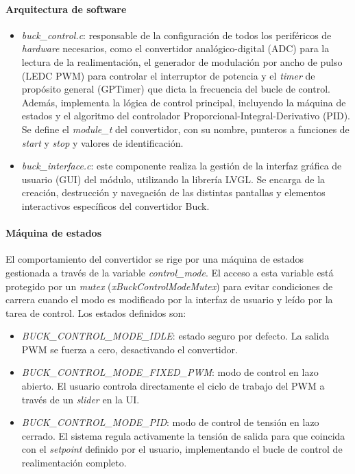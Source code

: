 \paragraph{Arquitectura de software}

\begin{itemize}[noitemsep]
    \item \textit{buck\_control.c}: responsable de la configuración de todos los periféricos de \textit{hardware} necesarios, como el convertidor analógico-digital (ADC) para la lectura de la realimentación, el generador de modulación por ancho de pulso (LEDC PWM) para controlar el interruptor de potencia y el \textit{timer} de propósito general (GPTimer) que dicta la frecuencia del bucle de control. Además, implementa la lógica de control principal, incluyendo la máquina de estados y el algoritmo del controlador Proporcional-Integral-Derivativo (PID). Se define el \textit{module\_t} del convertidor, con su nombre, punteros a funciones de \textit{start} y \textit{stop} y valores de identificación.
    \item \textit{buck\_interface.c}: este componente realiza la gestión de la interfaz gráfica de usuario (GUI) del módulo, utilizando la librería LVGL. Se encarga de la creación, destrucción y navegación de las distintas pantallas y elementos interactivos específicos del convertidor Buck.
\end{itemize}

\paragraph{Máquina de estados}

El comportamiento del convertidor se rige por una máquina de estados gestionada a través de la variable \textit{control\_mode}. El acceso a esta variable está protegido por un \textit{mutex} (\textit{xBuckControlModeMutex}) para evitar condiciones de carrera cuando el modo es modificado por la interfaz de usuario y leído por la tarea de control. Los estados definidos son:

\begin{itemize}[noitemsep]
    \item \textit{BUCK\_CONTROL\_MODE\_IDLE}: estado seguro por defecto. La salida PWM se fuerza a cero, desactivando el convertidor.
    \item \textit{BUCK\_CONTROL\_MODE\_FIXED\_PWM}: modo de control en lazo abierto. El usuario controla directamente el ciclo de trabajo del PWM a través de un \textit{slider} en la UI.
    \item \textit{BUCK\_CONTROL\_MODE\_PID}: modo de control de tensión en lazo cerrado. El sistema regula activamente la tensión de salida para que coincida con el \textit{setpoint} definido por el usuario, implementando el bucle de control de realimentación completo.
\end{itemize}

